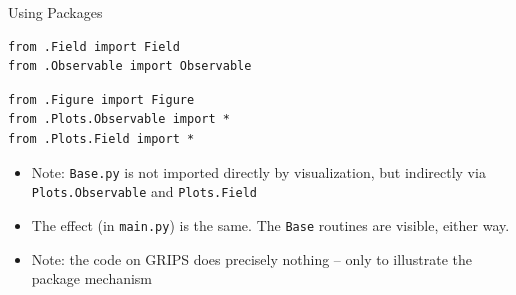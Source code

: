 
\begin{frame}[fragile]{Using Packages}
%
\begin{tcbraster}[raster columns=2,
                  raster equal height,
                  nobeforeafter,
                  raster column skip=0.5cm]
%
\begin{codebox}
\begin{verbatim}
from .Field import Field
from .Observable import Observable
\end{verbatim}
\end{codebox}
%
\begin{codebox}
\begin{verbatim}
from .Figure import Figure
from .Plots.Observable import *
from .Plots.Field import *
\end{verbatim}
\end{codebox}
%
\end{tcbraster}
%
\begin{itemize}
\item Note: \texttt{Base.py} is not imported directly by visualization, but indirectly via \texttt{Plots.Observable} and \texttt{Plots.Field}
\item The effect (in \texttt{main.py}) is the same. The \texttt{Base} routines are visible, either way.
\item Note: the code on GRIPS does precisely nothing -- only to illustrate the package mechanism
\end{itemize}
%
\end{frame}


